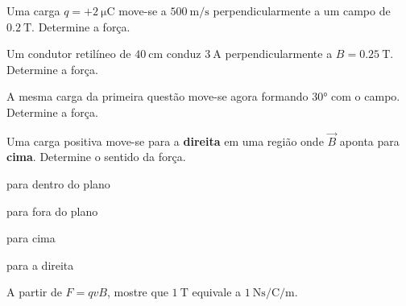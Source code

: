 \blocofixacao
\begin{questao}[1]{}

Uma carga $q=+\SI{2}{\micro\coulomb}$ move-se a $\SI{500}{\meter\per\second}$
perpendicularmente a um campo de $\SI{0.2}{\tesla}$. Determine a força.


\end{questao}
\begin{questao}[1]{}

Um condutor retilíneo de $\SI{40}{\centi\meter}$ conduz $\SI{3}{\ampere}$
perpendicularmente a $B=\SI{0.25}{\tesla}$. Determine a força.


\end{questao}
\begin{questao}[1]{}

A mesma carga da primeira questão move-se agora formando $\ang{30}$ com o
campo. Determine a força.


\end{questao}
\begin{questao}[1]{}

Uma carga positiva move-se para a \textbf{direita} em uma região onde
$\vec B$ aponta para \textbf{cima}. Determine o sentido da força.
\begin{alternativas}[2]
\item para dentro do plano
\item para fora do plano
\item para cima
\item para a direita
\end{alternativas}


\end{questao}
\begin{questao}[1]{}

A partir de $F=qvB$, mostre que $\SI{1}{\tesla}$ equivale a
$\SI{1}{\newton\second\per\coulomb\per\meter}$.
\resposta{$\si{\tesla}=\dfrac{\si{\newton}}{\si{\coulomb}\cdot
\si{\meter\per\second}}$}


\end{questao}

